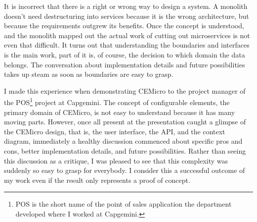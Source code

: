 It is incorrect that there is a right or wrong way to design a system. A monolith doesn't need destructuring into services because it is the wrong architecture, but because the requirements outgrew its benefits. Once the concept is understood, and the monolith mapped out the actual work of cutting out microservices is not even that difficult. It turns out that understanding the boundaries and interfaces is the main work, part of it is, of course, the decision to which domain the data belongs. The conversation about implementation details and future possibilities takes up steam as soon as boundaries are easy to grasp.

I made this experience when demonstrating CEMicro to the project manager of the POS\footnote{POS is the short name of the point of sales application the department developed where I worked at Capgemini.} project at Capgemini. The concept of configurable elements, the primary domain of CEMicro, is not easy to understand because it has many moving parts. However, once all present at the presentation caught a glimpse of the CEMicro design, that is, the user interface, the API, and the context diagram, immediately a healthy discussion commenced about specific pros and cons, better implementation details, and future possibilities. Rather than seeing this discussion as a critique, I was pleased to see that this complexity was suddenly so easy to grasp for everybody. I consider this a successful outcome of my work even if the result only represents a proof of concept.




